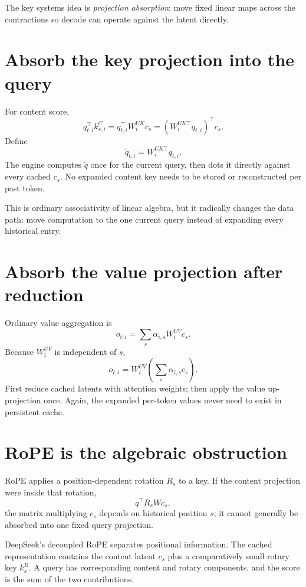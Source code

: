The key systems idea is \emph{projection absorption}: move fixed linear maps across
the contractions so decode can operate against the latent directly.

\section{Absorb the key projection into the query}

For content score,
\[
q_{t,i}^{\top}k^C_{s,i}
=q_{t,i}^{\top}W^{UK}_i c_s
=(W^{UK\top}_i q_{t,i})^{\top}c_s.
\]
Define
\[
\widetilde q_{t,i}=W^{UK\top}_i q_{t,i}.
\]
The engine computes $\widetilde q$ once for the current query, then dots it directly
against every cached $c_s$. No expanded content key needs to be stored or reconstructed
per past token.

This is ordinary associativity of linear algebra, but it radically changes the data
path: move computation to the one current query instead of expanding every historical
entry.

\section{Absorb the value projection after reduction}

Ordinary value aggregation is
\[
o_{t,i}=\sum_s\alpha_{i,s}W^{UV}_ic_s.
\]
Because $W^{UV}_i$ is independent of $s$,
\[
o_{t,i}=W^{UV}_i\left(\sum_s\alpha_{i,s}c_s\right).
\]
First reduce cached latents with attention weights; then apply the value up-projection
once. Again, the expanded per-token values never need to exist in persistent cache.


\section{RoPE is the algebraic obstruction}

RoPE applies a position-dependent rotation $R_s$ to a key. If the content projection
were inside that rotation,
\[
q^\top R_s Wc_s,
\]
the matrix multiplying $c_s$ depends on historical position $s$; it cannot generally
be absorbed into one fixed query projection.

DeepSeek's decoupled RoPE separates positional information. The cached representation
contains the content latent $c_s$ plus a comparatively small rotary key $k^R_s$. A
query has corresponding content and rotary components, and the score is the sum of the
two contributions.

